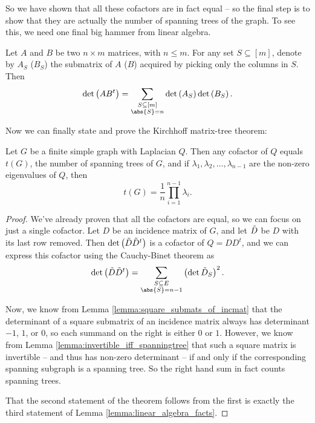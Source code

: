 \documentclass[nobib]{tufte-handout}
\begin{document}
So we have shown that all these cofactors are in fact equal -- so the final step is to show that they are actually the number of spanning trees of the graph. To see this, we need one final big hammer from linear algebra.

\begin{theorem}
    Let $A$ and $B$ be two $n\times m$ matrices, with $n \leq m$. For any set $S\subseteq [m]$, denote by $A_S$ ($B_S$) the submatrix of $A$ ($B$) acquired by picking only the columns in $S$. Then
    $$\det\left(AB^t\right) = \sum_{\substack{S \subseteq [m]\\\abs{S} = n}} \det\left(A_S\right)\det\left(B_S\right).$$
\end{theorem}

Now we can finally state and prove the Kirchhoff matrix-tree theorem:

\begin{theorem}
    Let $G$ be a finite simple graph with Laplacian $Q$. Then any cofactor of $Q$ equals $t(G)$, the number of spanning trees of $G$, and if $\lambda_1, \lambda_2, \ldots, \lambda_{n-1}$ are the non-zero eigenvalues of $Q$, then
    $$t(G) = \frac{1}{n}\prod_{i=1}^{n-1}\lambda_i.$$

    \begin{proof}
        We've already proven that all the cofactors are equal, so we can focus on just a single cofactor. Let $D$ be an incidence matrix of $G$, and let $\Tilde{D}$ be $D$ with its last row removed. Then $\det\left(\Tilde{D}\Tilde{D}^t\right)$ is a cofactor of $Q = DD^t$, and we can express this cofactor using the Cauchy-Binet theorem as
        $$\det\left(\Tilde{D}\Tilde{D}^t\right) = \sum_{\substack{S \subseteq E\\\abs{S} = n - 1}} \left(\det \Tilde{D}_S\right)^2.$$

        Now, we know from Lemma \ref{lemma:square_submats_of_incmat} that the determinant of a square submatrix of an incidence matrix always has determinant $-1$, $1$, or $0$, so each summand on the right is either $0$ or $1$. However, we know from Lemma \ref{lemma:invertible_iff_spanningtree} that such a square matrix is invertible -- and thus has non-zero determinant -- if and only if the corresponding spanning subgraph is a spanning tree. So the right hand sum in fact counts spanning trees.

        That the second statement of the theorem follows from the first is exactly the third statement of Lemma \ref{lemma:linear_algebra_facts}.
    \end{proof}
\end{theorem}
\end{document}
